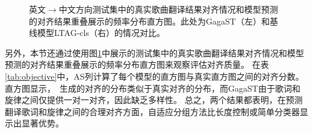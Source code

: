 \begin{figure}[!h]
    \centering
\caption{英文$\rightarrow$中文方向测试集中的真实歌曲翻译结果对齐情况和模型预测的对齐结果重叠展示的频率分布直方图。此处为GagaST（左）和基线模型LTAG-cls（右）的情况对比。}
\label{fig:align_hist1}
\end{figure}
另外，本节还通过使用图\ref{fig:align_hist1}中展示的测试集中的真实歌曲翻译结果对齐情况和模型预测的对齐结果重叠展示的频率分布直方图来观察评估对齐质量。
在表\ref{tab:objective}中，AS列计算了每个模型的直方图与真实直方图之间的对齐分数。
直方图显示，\modelname~生成的对齐的分布类似于真实对齐的分布，而GagaST由于歌词和旋律之间仅提供一对一对齐，因此缺乏多样性。
总之，两个结果都表明，在预测翻译歌词和旋律之间的合理对齐方面，自适应分组方法比长度控制或简单分类器显示出显著优势。
